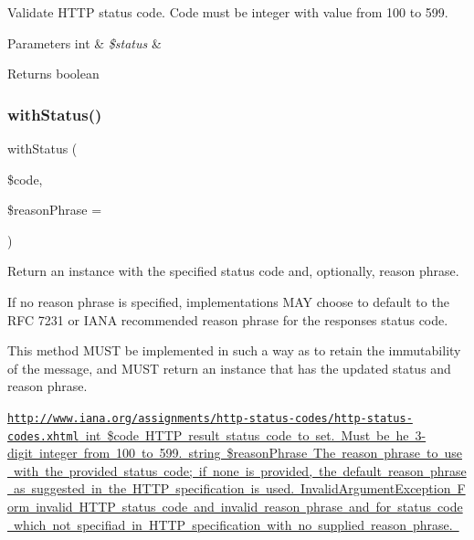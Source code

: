 Validate H\+T\+TP status code. Code must be integer with value from 100 to 599. 
\begin{DoxyParams}[1]{Parameters}
int & {\em \$status} & \\
\hline
\end{DoxyParams}
\begin{DoxyReturn}{Returns}
boolean 
\end{DoxyReturn}
\mbox{\label{class_pes_1_1_http_1_1_response_adea4a553d385286f0457844663023b27}} 
\subsubsection{\texorpdfstring{with\+Status()}{withStatus()}}
{\footnotesize\ttfamily with\+Status (\begin{DoxyParamCaption}\item[{}]{\$code,  }\item[{}]{\$reason\+Phrase = {\ttfamily \textquotesingle{}\textquotesingle{}} }\end{DoxyParamCaption})}

Return an instance with the specified status code and, optionally, reason phrase.

If no reason phrase is specified, implementations M\+AY choose to default to the R\+FC 7231 or I\+A\+NA recommended reason phrase for the response\textquotesingle{}s status code.

This method M\+U\+ST be implemented in such a way as to retain the immutability of the message, and M\+U\+ST return an instance that has the updated status and reason phrase.

\mbox{\hyperlink{}{\href{http://www.iana.org/assignments/http-status-codes/http-status-codes.xhtml}{\tt http\+://www.\+iana.\+org/assignments/http-\/status-\/codes/http-\/status-\/codes.\+xhtml}  int \$code H\+T\+TP result status code to set. Must be he 3-\/digit integer from 100 to 599.  string \$reason\+Phrase The reason phrase to use with the provided status code; if none is provided, the default reason phrase as suggested in the H\+T\+TP specification is used.    Invalid\+Argument\+Exception Form invalid H\+T\+TP status code and invalid reason phrase and for status code which not specifiad in H\+T\+TP specification with no supplied reason phrase. }}

